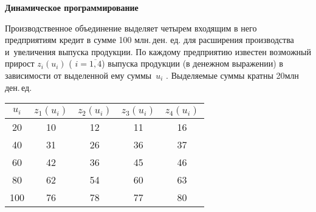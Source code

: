 \documentclass[a5paper,11pt]{extarticle}
\begin{document}
\begin{enumerate}
  {\item[]
          \bfseries Динамическое программирование
          \par\vspace{1mm}
  }


\item 
Производственное объединение выделяет четырем входящим в него
предприятиям кредит в сумме 100 млн.\,ден. ед. для расширения производства и~увеличения выпуска продукции. 
По каждому предприятию известен возможный прирост $z_i(u_i)$ ( $i = \overline{1,4}$) выпуска продукции (в денежном выражении) в зависимости от выделенной ему суммы~$u_i$ . Выделяемые суммы кратны
20\;млн\,ден.\,ед. 

{\centering
\begin{tabular}{c|cccc}
$u_i$&$z_1(u_i)$&$z_2(u_i)$&$z_3(u_i)$&$z_4(u_i)$\\
\hline
20 & 10 & 12& 11& 16\\
40 & 31 & 26& 36& 37\\
60 & 42 & 36& 45& 46\\
80 & 62 & 54& 60& 63\\
100& 76 & 78& 77& 80\\
\end{tabular}\par}
\medskip

%
%
%


\end{enumerate}
\end{document}
